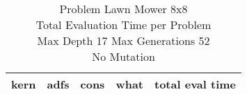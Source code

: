 \begin{table}[H]
\caption{Problem  Lawn Mower 8x8\\Total Evaluation Time per Problem \\ Max Depth 17 Max Generations 52\\ No Mutation \\}
\begin{center}
\scalebox{1.0} %
{
\begin{tabular}{llllr}
\hline
kern & adfs & cons & what & total eval time \\
\hline


\end{tabular}
}
\end{center}
\end{table}

